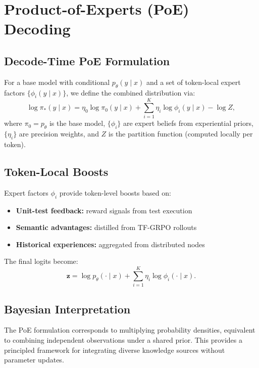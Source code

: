 \section{Product-of-Experts (PoE) Decoding}
\subsection{Decode-Time PoE Formulation}
For a base model with conditional \(p_\theta(y\mid x)\) and a set of token-local expert factors \(\{\phi_i(y\mid x)\}\), we define the combined distribution via:
\begin{equation}\label{eq:poe-main}
\log \pi_*(y\mid x) = \eta_0 \log \pi_0(y\mid x) + \sum_{i=1}^K \eta_i \log \phi_i(y\mid x) - \log Z,
\end{equation}
where \(\pi_0 = p_\theta\) is the base model, \(\{\phi_i\}\) are expert beliefs from experiential priors, \(\{\eta_i\}\) are precision weights, and \(Z\) is the partition function (computed locally per token).

\subsection{Token-Local Boosts}
Expert factors \(\phi_i\) provide token-level boosts based on:
\begin{itemize}[leftmargin=1.1em]
  \item \textbf{Unit-test feedback:} reward signals from test execution
  \item \textbf{Semantic advantages:} distilled from TF-GRPO rollouts
  \item \textbf{Historical experiences:} aggregated from distributed nodes
\end{itemize}

The final logits become:
\begin{equation}
\bm z = \log p_\theta(\cdot\mid x) + \sum_{i=1}^K \eta_i \log \phi_i(\cdot\mid x).
\end{equation}

\subsection{Bayesian Interpretation}
The PoE formulation corresponds to multiplying probability densities, equivalent to combining independent observations under a shared prior. This provides a principled framework for integrating diverse knowledge sources without parameter updates.
